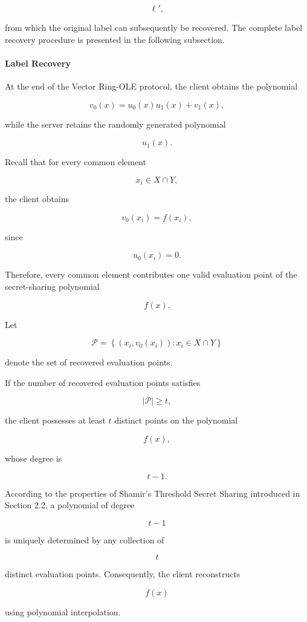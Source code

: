 \documentclass[11pt,a4paper]{article}
\begin{document}
\[
\ell',
\]

from which the original label can subsequently be recovered. The complete label recovery procedure is presented in the following subsection.

\paragraph{Label Recovery}

At the end of the Vector Ring-OLE protocol, the client obtains the polynomial

\[
v_0(x)=u_0(x)u_1(x)+v_1(x),
\]

while the server retains the randomly generated polynomial

\[
u_1(x).
\]

Recall that for every common element

\[
x_i \in X\cap Y,
\]

the client obtains

\[
v_0(x_i)=f(x_i),
\]

since

\[
u_0(x_i)=0.
\]

Therefore, every common element contributes one valid evaluation point of the secret-sharing polynomial

\[
f(x).
\]

Let

\[
\mathcal{P}
=
\left\{
(x_i,v_0(x_i))
:
x_i\in X\cap Y
\right\}
\]

denote the set of recovered evaluation points.

If the number of recovered evaluation points satisfies

\[
|\mathcal P|
\ge
t,
\]

the client possesses at least \(t\) distinct points on the polynomial

\[
f(x),
\]

whose degree is

\[
t-1.
\]

According to the properties of Shamir's Threshold Secret Sharing introduced in Section 2.2, a polynomial of degree

\[
t-1
\]

is uniquely determined by any collection of

\[
t
\]

distinct evaluation points. Consequently, the client reconstructs

\[
f(x)
\]

using polynomial interpolation.
\end{document}
